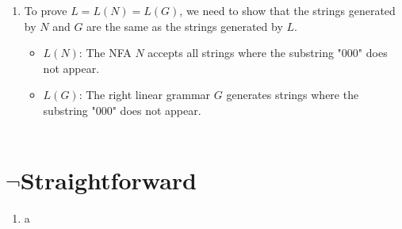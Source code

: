 \documentclass[a4paper]{article}
\begin{document}
\begin{enumerate}
\begin{enumerate}[label=\arabic*)]
\begin{enumerate}[label=(\alph*)]
                \item To prove $L = L(N) = L(G)$, we need to show that the strings generated by $N$ and $G$ are the same as the strings generated by $L$. \\
                \begin{itemize}
                    \item $L(N)$: The NFA $N$ accepts all strings where the substring "000" does not appear.
                    \item $L(G)$: The right linear grammar $G$ generates strings where the substring "000" does not appear. \\ \\
                \end{itemize}
            \end{enumerate}
        \end{enumerate}

    \end{enumerate}

\newpage
\section{$\neg$Straightforward}
    \begin{enumerate}
        \item a

    \end{enumerate}

\newpage
\end{document}
